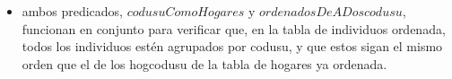 \begin{itemize}
            \item ambos predicados, $codusuComoHogares$ y $ordenadosDeADoscodusu$, funcionan en conjunto para verificar que, 
            en la tabla de individuos ordenada, todos los individuos est\'en agrupados por codusu, 
            y que estos sigan el mismo orden que el de los hogcodusu de la tabla de hogares ya ordenada.
        \end{itemize}
